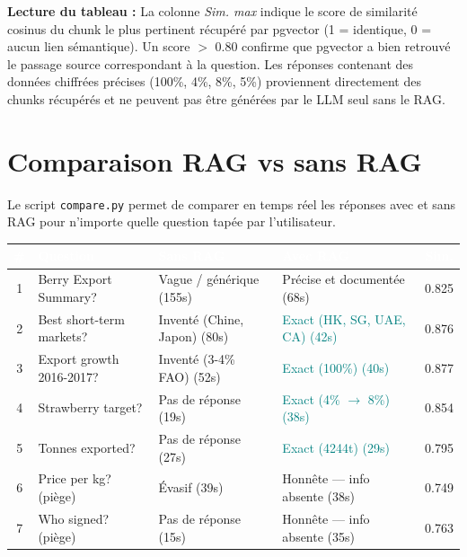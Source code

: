 \documentclass[12pt,a4paper]{report}
\begin{document}
\begin{captionbox}
\textbf{Lecture du tableau :} La colonne \textit{Sim. max} indique le score de
similarité cosinus du chunk le plus pertinent récupéré par pgvector (1 = identique,
0 = aucun lien sémantique). Un score $>$ 0.80 confirme que pgvector a bien retrouvé
le passage source correspondant à la question. Les réponses contenant des données
chiffrées précises (100\%, 4\%, 8\%, 5\%) proviennent directement des chunks
récupérés et ne peuvent pas être générées par le LLM seul sans le RAG.
\end{captionbox}

\chapter{Comparaison RAG vs sans RAG}

Le script \texttt{compare.py} permet de comparer en temps réel les réponses avec
et sans RAG pour n'importe quelle question tapée par l'utilisateur.

\vspace{8pt}
\begin{center}
\small
\begin{tabular}{|c|p{3cm}|p{3.5cm}|p{3.5cm}|c|}
  \hline
  \rowcolor{mainblue}
  \textcolor{white}{\textbf{\#}} &
  \textcolor{white}{\textbf{Question}} &
  \textcolor{white}{\textbf{Sans RAG}} &
  \textcolor{white}{\textbf{Avec RAG}} &
  \textcolor{white}{\textbf{Sim.}} \\
  \hline
  1 & Berry Export Summary? &
      Vague / générique (155s) &
      Précise et documentée (68s) & 0.825 \\
  \rowcolor{lightblue}
  2 & Best short-term markets? &
      \textcolor{telecomred}{Inventé (Chine, Japon) (80s)} &
      \textcolor{teal}{Exact (HK, SG, UAE, CA) (42s)} & 0.876 \\
  3 & Export growth 2016-2017? &
      \textcolor{telecomred}{Inventé (3-4\% FAO) (52s)} &
      \textcolor{teal}{Exact (100\%) (40s)} & 0.877 \\
  \rowcolor{lightblue}
  4 & Strawberry target? &
      Pas de réponse (19s) &
      \textcolor{teal}{Exact (4\% $\rightarrow$ 8\%) (38s)} & 0.854 \\
  5 & Tonnes exported? &
      Pas de réponse (27s) &
      \textcolor{teal}{Exact (4244t) (29s)} & 0.795 \\
  \rowcolor{lightblue}
  6 & Price per kg? (piège) &
      Évasif (39s) &
      Honnête — info absente (38s) & 0.749 \\
  7 & Who signed? (piège) &
      Pas de réponse (15s) &
      Honnête — info absente (35s) & 0.763 \\
  \hline
\end{tabular}
\end{center}
\end{document}
